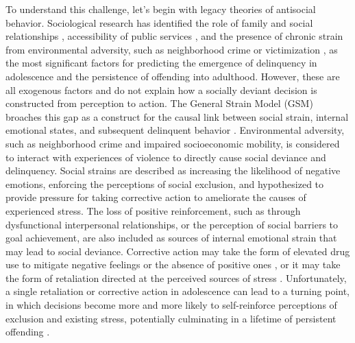 \documentclass[utf8]{article}
\begin{document}
To understand this challenge, let's begin with legacy theories of antisocial behavior. Sociological research has identified the role of family and social relationships \citep{tolan1997assessment,henry2001longitudinal}, accessibility of public services \citep{molnar2008effects}, and the presence of chronic strain from environmental adversity, such as neighborhood crime or victimization \citep{esbensen1991juvenile}, as the most significant factors for predicting the emergence of delinquency in adolescence and the persistence of offending into adulthood. However, these are all exogenous factors and do not explain how a socially deviant decision is constructed from perception to action. The General Strain Model (GSM) broaches this gap as a construct for the causal link between social strain, internal emotional states, and subsequent delinquent behavior \citep{agnew2001building,agnew2007pressure}. Environmental adversity, such as neighborhood crime and impaired socioeconomic mobility, is considered to interact with experiences of violence to directly cause social deviance and delinquency. Social strains are described as increasing the likelihood of negative emotions, enforcing the perceptions of social exclusion, and hypothesized to provide pressure for taking corrective action to ameliorate the causes of experienced stress. The loss of positive reinforcement, such as through dysfunctional interpersonal relationships, or the perception of social barriers to goal achievement, are also included as sources of internal emotional strain that may lead to social deviance. Corrective action may take the form of elevated drug use to mitigate negative feelings or the absence of positive ones \citep{slocum2010general}, or it may take the form of retaliation directed at the perceived sources of stress \citep{warner2003strain}. Unfortunately, a single retaliation or corrective action in adolescence can lead to a turning point, in which decisions become more and more likely to self-reinforce perceptions of exclusion and existing stress, potentially culminating in a lifetime of persistent offending \citep{laub1993turning}. 
\end{document}
